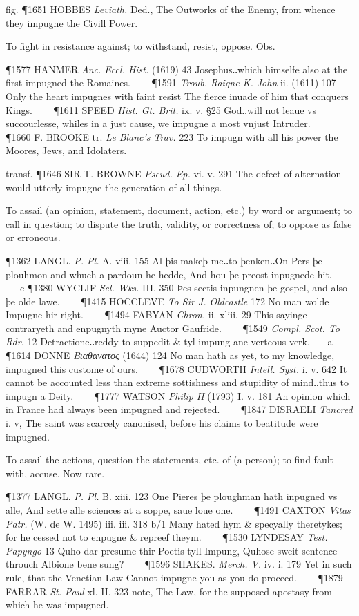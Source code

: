 \begin{description}[wide, labelwidth=!, labelindent=0pt]
\begin{myenumerate}
fig. \P 1651 HOBBES  \textit{Leviath.} Ded., The Outworks of the Enemy, from whence they impugne the Civill Power.

 To fight in resistance against; to withstand, resist, oppose. Obs.

\P 1577 HANMER  \textit{Anc. Eccl. Hist.} (1619) 43 Josephus‥which himselfe also at the first impugned the Romaines.    
\P 1591  \textit{Troub. Raigne K. John} ii. (1611) 107 Only the heart impugnes with faint resist The fierce inuade of him that conquers Kings.    
\P 1611 SPEED  \textit{Hist. Gt. Brit.} ix. v. §25 God‥will not leaue vs succourlesse, whiles in a just cause, we impugne a most vnjust Intruder.    
\P 1660 F. BROOKE tr. \textit{Le Blanc's Trav.} 223 To impugn with all his power the Moores, Jews, and Idolaters.

transf. \P 1646 SIR T. BROWNE  \textit{Pseud. Ep.} vi. v. 291 The defect of alternation would utterly impugne the generation of all things.

 To assail (an opinion, statement, document, action, etc.) by word or argument; to call in question; to dispute the truth, validity, or correctness of; to oppose as false or erroneous.

\P 1362 LANGL.  \textit{P. Pl.} A. viii. 155 Al þis makeþ me‥to þenken‥On Pers þe plouhmon and whuch a pardoun he hedde, And hou þe preost inpugnede hit.    c 
\P 1380 WYCLIF  \textit{Sel. Wks.} III. 350 Þes sectis inpungnen þe gospel, and also þe olde lawe.    
\P 1415 HOCCLEVE  \textit{To Sir J. Oldcastle} 172 No man wolde Impugne hir right.    
\P 1494 FABYAN \textit{Chron.} ii. xliii. 29 This sayinge contraryeth and enpugnyth myne Auctor Gaufride.    
\P 1549  \textit{Compl. Scot. To Rdr.} 12 Detractione‥reddy to suppedit \& tyl impung ane verteous verk.    a 
\P 1614 DONNE  \textit{Βιαθανατος} (1644) 124 No man hath as yet, to my knowledge, impugned this custome of ours.    
\P 1678 CUDWORTH  \textit{Intell. Syst.} i. v. 642 It cannot be accounted less than extreme sottishness and stupidity of mind‥thus to impugn a Deity.    
\P 1777 WATSON  \textit{Philip II} (1793) I. v. 181 An opinion which in France had always been impugned and rejected.    
\P 1847 DISRAELI  \textit{Tancred} i. v, The saint was scarcely canonised, before his claims to beatitude were impugned.

 To assail the actions, question the statements, etc. of (a person); to find fault with, accuse. Now rare.

\P 1377 LANGL.  \textit{P. Pl.} B. xiii. 123 One Pieres þe ploughman hath inpugned vs alle, And sette alle sciences at a soppe, saue loue one.    
\P 1491 CAXTON  \textit{Vitas Patr.} (W. de W. 1495) iii. iii. 318 b/1 Many hated hym \& specyally theretykes; for he cessed not to enpugne \& repreef theym.    
\P 1530 LYNDESAY  \textit{Test. Papyngo} 13 Quho dar presume thir Poetis tyll Impung, Quhose sweit sentence throuch Albione bene sung?    
\P 1596 SHAKES.  \textit{Merch. V.} iv. i. 179 Yet in such rule, that the Venetian Law Cannot impugne you as you do proceed.    
\P 1879 FARRAR  \textit{St. Paul} xl. II. 323 note, The Law, for the supposed apostasy from which he was impugned.


\end{myenumerate}
\end{description}
